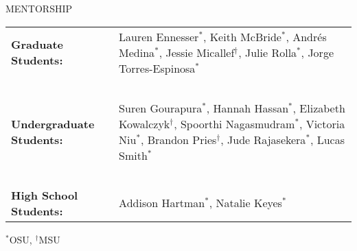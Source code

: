 \documentclass{resume} %
\begin{document}
\begin{rSection}{MENTORSHIP}
\begin{table}[h]
\begin{tabularx}{\textwidth}{l X}
 {\bf Graduate Students:}  & Lauren Ennesser$^*$, Keith McBride$^*$, Andr\'es Medina$^*$, Jessie Micallef$^\dagger$, Julie Rolla$^*$,  Jorge Torres-Espinosa$^*$ \\
 ~ & ~ \\
{\bf Undergraduate Students:}  & Suren Gourapura$^*$, Hannah Hassan$^*$, Elizabeth Kowalczyk$^\dagger$, Spoorthi Nagasmudram$^*$, Victoria Niu$^*$, Brandon Pries$^\dagger$, Jude Rajasekera$^*$, Lucas Smith$^*$\\
~ & ~ \\
{\bf High School Students:} &  Addison Hartman$^*$, Natalie Keyes$^*$\\
\end{tabularx}
\end{table}
$^*$OSU, $^\dagger$MSU

\end{rSection}
\end{document}
